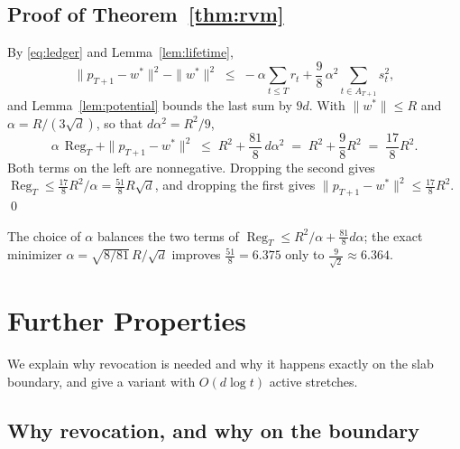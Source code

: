 \documentclass[11pt]{article}
\theoremstyle{plain}
\theoremstyle{definition}
\theoremstyle{remark}
\newtheorem{remark}[theorem]{Remark}
\DeclareMathOperator{\Reg}{Reg}
\newcommand{\wstar}{w^{\ast}}
\begin{document}
\subsection{Proof of Theorem~\ref{thm:rvm}}\label{sec:proof}

By \eqref{eq:ledger} and Lemma~\ref{lem:lifetime},
\[
  \|p_{T+1}-\wstar\|^{2}-\|\wstar\|^{2}\;\le\;-\alpha\sum_{t\le T}r_t
  +\frac98\,\alpha^{2}\!\!\sum_{t\in A_{T+1}}\!\!s_t^{2} ,
\]
and Lemma~\ref{lem:potential} bounds the last sum by $9d$. With $\|\wstar\|\le R$ and
$\alpha=R/(3\sqrt d)$, so that $d\alpha^{2}=R^{2}/9$,
\[
  \alpha\,\Reg_T+\|p_{T+1}-\wstar\|^{2}\;\le\;R^{2}+\frac{81}{8}\,d\alpha^{2}
  \;=\;R^{2}+\frac98R^{2}\;=\;\frac{17}{8}R^{2} .
\]
Both terms on the left are nonnegative. Dropping the second gives
$\Reg_T\le\tfrac{17}{8}R^{2}/\alpha=\tfrac{51}{8}R\sqrt d$, and dropping the first gives
$\|p_{T+1}-\wstar\|^{2}\le\tfrac{17}{8}R^{2}$. \qed

\medskip
The choice of $\alpha$ balances the two terms of $\Reg_T\le R^{2}/\alpha+\tfrac{81}{8}d\alpha$; the
exact minimizer $\alpha=\sqrt{8/81}\,R/\sqrt d$ improves $\tfrac{51}{8}=6.375$ only to
$\tfrac{9}{\sqrt2}\approx6.364$.

\section{Further Properties}\label{sec:further}

We explain why revocation is needed and why it happens exactly on the slab boundary, and give a
variant with $O(d\log t)$ active stretches.

\subsection{Why revocation, and why on the boundary}\label{sec:why}
\end{document}
